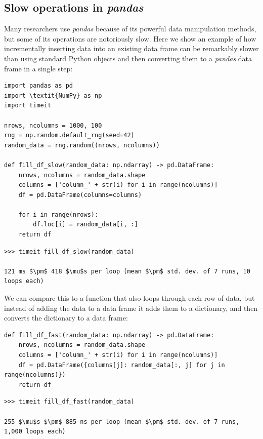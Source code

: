 \subsection{Slow operations in \textit{pandas}}

Many researchers use \textit{pandas} because of its powerful data manipulation methods, but some of its operations are notoriously slow.  Here we show an example of how incrementally inserting data into an existing data frame can be remarkably slower than using standard Python objects and then converting them to a \textit{pandas} data frame in a single step:

\begin{lstlisting}[style=Python]
import pandas as pd 
import \textit{NumPy} as np
import timeit

nrows, ncolumns = 1000, 100
rng = np.random.default_rng(seed=42)
random_data = rng.random((nrows, ncolumns))

def fill_df_slow(random_data: np.ndarray) -> pd.DataFrame:
    nrows, ncolumns = random_data.shape
    columns = ['column_' + str(i) for i in range(ncolumns)]
    df = pd.DataFrame(columns=columns)

    for i in range(nrows):
        df.loc[i] = random_data[i, :]
    return df

\end{lstlisting}

\begin{lstlisting}[style=replshort, mathescape=true]
>>> timeit fill_df_slow(random_data)

121 ms $\pm$ 418 $\mu$s per loop (mean $\pm$ std. dev. of 7 runs, 10 loops each)
\end{lstlisting}

We can compare this to a function that also loops through each row of data, but instead of adding the data to a data frame it adds them to a dictionary, and then converts the dictionary to a data frame:

\begin{lstlisting}[style=Python]
def fill_df_fast(random_data: np.ndarray) -> pd.DataFrame:
    nrows, ncolumns = random_data.shape
    columns = ['column_' + str(i) for i in range(ncolumns)]
    df = pd.DataFrame({columns[j]: random_data[:, j] for j in range(ncolumns)})
    return df

\end{lstlisting}

\begin{lstlisting}[style=replshort, mathescape=true]
>>> timeit fill_df_fast(random_data)

255 $\mu$s $\pm$ 885 ns per loop (mean $\pm$ std. dev. of 7 runs, 1,000 loops each)
\end{lstlisting}

